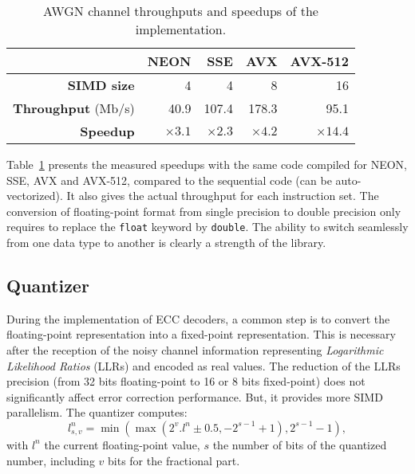 \begin{table}[htp]
  \centering
  \caption{AWGN channel throughputs and speedups of the \MIPP implementation.}
  \label{lst:opt_simu_awgn_speedup}
  \begin{tabular}{r | r  r r r}
                             & \textbf{NEON} & \textbf{SSE} & \textbf{AVX} & \textbf{AVX-512} \\ \hline \hline
  \textbf{SIMD size}         & 4             & 4            & 8            & 16               \\ %
  \textbf{Throughput} (Mb/s) & 40.9          & 107.4        & 178.3        & 95.1             \\ %
  \textbf{Speedup}           & $\times 3.1$  & $\times 2.3$ & $\times 4.2$ & $\times 14.4$    \\
  \end{tabular}
\end{table}

Table~\ref{lst:opt_simu_awgn_speedup} presents the measured speedups with the
same \MIPP code compiled for NEON, SSE, AVX and AVX-512, compared to the
sequential code (can be auto-vectorized). It also gives the actual throughput
for each instruction set. The conversion of floating-point format from single
precision to double precision only requires to replace the \verb|float| keyword
by \verb|double|. The ability to switch seamlessly from one data type to another
is clearly a strength of the \MIPP library.

\subsection{Quantizer}
\label{sec:opt_simu_quantizer}

During the implementation of ECC decoders, a common step is to convert the
floating-point representation into a fixed-point representation. This is
necessary after the reception of the noisy channel information representing
\textit{Logarithmic Likelihood Ratios} (LLRs) and encoded as real values. The
reduction of the LLRs precision (from 32 bits floating-point to 16 or 8 bits
fixed-point) does not significantly affect error correction performance. But, it
provides more SIMD parallelism. The quantizer computes:
\begin{equation}
\label{eq:opt_simu_quantizer}
l_{s,v}^n = \min(\max(2^v . l^n \pm 0.5, -2^{s-1} +1), 2^{s-1} -1),
\end{equation}
with $l^n$ the current floating-point value, $s$ the number of bits of the
quantized number, including $v$ bits for the fractional part.

